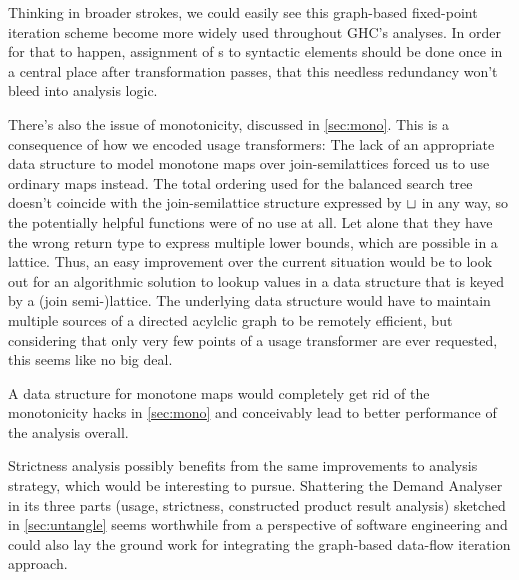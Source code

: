 Thinking in broader strokes, we could easily see this graph-based fixed-point iteration scheme become more widely used throughout GHC's analyses.
In order for that to happen, assignment of s to syntactic elements should be done once in a central place after transformation passes, that this needless redundancy won't bleed into analysis logic.

There's also the issue of monotonicity, discussed in \cref{sec:mono}.
This is a consequence of how we encoded usage transformers:
The lack of an appropriate data structure to model monotone maps over join-semilattices forced us to use ordinary maps instead.
The total ordering used for the balanced search tree doesn't coincide with the join-semilattice structure expressed by $\sqcup$ in any way, so the potentially helpful functions  were of no use at all. 
Let alone that they have the wrong return type to express multiple lower bounds, which are possible in a lattice.
Thus, an easy improvement over the current situation would be to look out for an algorithmic solution to lookup values in a data structure that is keyed by a (join semi-)lattice.
The underlying data structure would have to maintain multiple sources of a directed acylclic graph to be remotely efficient, but considering that only very few points of a usage transformer are ever requested, this seems like no big deal.

A data structure for monotone maps would completely get rid of the monotonicity hacks in \cref{sec:mono} and conceivably lead to better performance of the analysis overall.

Strictness analysis possibly benefits from the same improvements to  analysis strategy, which would be interesting to pursue.
Shattering the Demand Analyser in its three parts (usage, strictness, constructed product result analysis) sketched in \cref{sec:untangle} seems worthwhile from a perspective of software engineering and could also lay the ground work for integrating the graph-based data-flow iteration approach.

